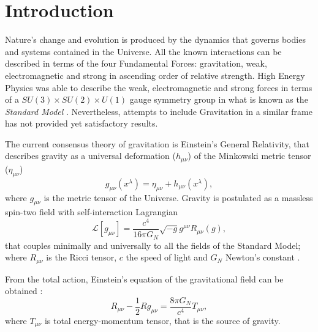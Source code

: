 \chapter{Introduction}
\label{ch:introduction}
Nature's change and evolution is produced by the dynamics that governs bodies and systems contained in the Universe. All the known interactions can be described in terms of the four Fundamental Forces: gravitation, weak, electromagnetic and strong in ascending order of relative strength. High Energy Physics was able to describe the weak, electromagnetic and strong forces in terms of a $SU(3)\times SU(2)\times U(1)$ gauge symmetry group in what is known as the {\it Standard Model} \cite{halzen1984quarks,peskin1995introduction,weinberg1995quantum,weinberg1996quantum,2000hep.ph....1283N}. Nevertheless, attempts to include Gravitation in a similar frame has not provided yet satisfactory results.
\newline

The current consensus theory of gravitation is Einstein's General Relativity, that describes gravity as a universal deformation ($h_{\mu\nu}$) of the Minkowski metric tensor ($\eta_{\mu\nu}$)
\begin{equation}
g_{\mu\nu}(x^\lambda) = \eta_{\mu\nu}+h_{\mu\nu}(x^\lambda),
\end{equation}
where $g_{\mu\nu}$ is the metric tensor of the Universe. Gravity is postulated as a massless spin-two field with self-interaction Lagrangian
\begin{equation}
\mathcal{L}[g_{\mu\nu}] = \frac{c^4}{16\pi G_N}\sqrt{-g}g^{\mu\nu}R_{\mu\nu}(g),
\end{equation}
that couples minimally and universally to all the fields of the Standard Model; where $R_{\mu\nu}$ is the Ricci tensor, $c$ the speed of light and $G_N$ Newton's constant \cite{PhysRev.138.B988,feynman1995feynman,1969ApJ...157..857F,PhysRevD.33.3613,0264-9381-4-5-024,0264-9381-4-5-025,Olive:2016xmw}.
\newline

From the total action, Einstein's equation of the gravitational field can be obtained \cite{ANDP:ANDP19163540702,1916AnP...354..769E}:
\begin{equation}
R_{\mu\nu}-\frac{1}{2}Rg_{\mu\nu} = \frac{8\pi G_N}{c^4}T_{\mu\nu},
\label{eq:einsteinbare}
\end{equation}
where $T_{\mu\nu}$ is total energy-momentum tensor, that is the source of gravity.

